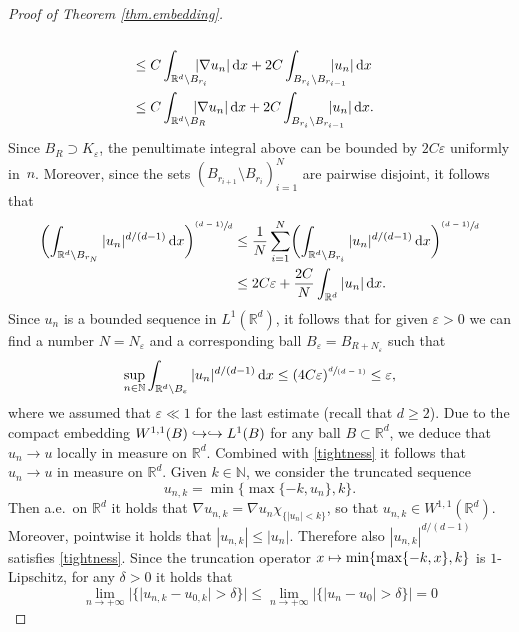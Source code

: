\documentclass[10pt]{amsart}
\def\mto{\mathchoice{\longmapsto}{\mapsto}{\mapsto}{\mapsto}}
\def\hto{\mathrel{\lhook\joinrel\to}}
\newcommand{\psfrac}[2]{\sfrac{(#1)}{#2}}
\newcommand{\spfrac}[2]{\sfrac{#1}{(#2)}}
\theoremstyle{definition}
\let\e\varepsilon
\newcommand{\dx}{\,\mathrm{d}x}
\newcommand{\R}{\mathbb{R}}
\newcommand{\N}{\mathbb{N}}
\begin{document}
\begin{proof}[Proof of Theorem \ref{thm.embedding}]
\begin{align*}
\\[-3pt]
&\leq C\int_{\R^d\setminus B_{r_{i}}}\hspace*{-4mm}|\nabla u_n|\dx+2C\int_{B_{r_{i}}\setminus B_{r_{i-1}}}\hspace*{-5mm}|u_n|\dx
\\
&\leq C\int_{\R^d\setminus B_{R}}\hspace*{-4mm}|\nabla u_n|\dx+2C\int_{B_{r_{i}}\setminus B_{r_{i-1}}}\hspace*{-5mm}|u_n|\dx.
\end{align*}
Since $B_R\supset K_{\e}$, the penultimate integral above can be bounded by $2C\e$ uniformly in~$n$. Moreover, since the sets $(B_{r_{i+1}}\setminus B_{r_i})_{i=1}^N$ are pairwise disjoint, it follows that
\begin{align*}
\biggl(\int_{\R^d\setminus B_{r_N}}|u_{n}|^{d/(d-1)}\dx\biggr)^{\psfrac{d-1}{d}}&\leq \frac{1}{N}\sum_{i=1}^N \biggl(\int_{\R^d\setminus B_{r_i}}|u_{n}|^{d/(d-1)}\dx\biggr)^{\psfrac{d-1}{d}}
\\
&\leq 2C\e+\frac{2C}{N}\int_{\R^d}|u_n|\dx.
\end{align*}
Since $u_n$ is a bounded sequence in $L^1(\R^d)$, it follows that for given $\e>0$ we can find a number $N=N_{\e}$ and a corresponding ball $B_{\e}=B_{R+N_{\e}}$ such that
\begin{equation}\label{tightness}
\sup_{n\in\N}\int_{\R^d\setminus B_{\e}}|u_n|^{d/(d-1)}\dx\leq (4C\e)^{\spfrac{d}{d-1}}\leq \e,
\end{equation}
where we assumed that $\e\ll 1$ for the last estimate (recall that $d\geq 2$). Due to the compact embedding $W^{1,1}(B)\hto\hto L^1(B)$ for any ball $B\subset\R^d$, we deduce that $u_n\to u$ locally in measure on $\R^d$. Combined with \eqref{tightness} it follows that $u_n\to u$ in measure on $\R^d$. Given $k\in\N$, we consider the truncated sequence\vspace*{-3pt}
\begin{equation*}
u_{n,k}=\min\{\max\{-k,u_n\},k\}.
\end{equation*}
Then a.e.\ on $\R^d$ it holds that $\nabla u_{n,k}=\nabla u_n\chi_{\{|u_n|< k\}}$, so that $u_{n,k}\in W^{1,1}(\R^d)$. Moreover, pointwise it holds that $|u_{n,k}|\leq |u_n|$. Therefore also $|u_{n,k}|^{d/(d-1)}$ satisfies \eqref{tightness}. Since the truncation operator $x\mto \min\{\max\{-k,x\},k\}$ is $1$-Lipschitz, for any $\delta>0$ it holds that\vspace*{-3pt}
\begin{equation*}
\lim_{n\to +\infty}|\{|u_{n,k}-u_{0,k}|>\delta\}|\leq \lim_{n\to +\infty}|\{|u_n-u_0|>\delta\}|=0

\end{equation*}
\end{proof}
\end{document}
